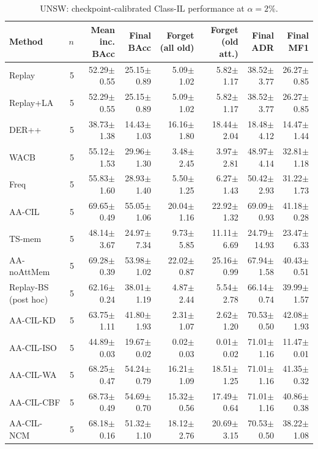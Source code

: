 \begin{table}[t]
\centering\scriptsize
\setlength{\tabcolsep}{3.3pt}
\caption{UNSW: checkpoint-calibrated Class-IL performance at $\alpha=2\%$.}\label{tab:forgetting-unsw_nb15}
\begin{tabular}{lrrrrrrr}
\toprule
Method & $n$ & Mean inc. BAcc & Final BAcc & Forget (all old) & Forget (old att.) & Final ADR & Final MF1 \\
\midrule
Replay & 5 & 52.29$\pm$0.55 & 25.15$\pm$0.89 & 5.09$\pm$1.02 & 5.82$\pm$1.17 & 38.52$\pm$3.77 & 26.27$\pm$0.85 \\
Replay+LA & 5 & 52.29$\pm$0.55 & 25.15$\pm$0.89 & 5.09$\pm$1.02 & 5.82$\pm$1.17 & 38.52$\pm$3.77 & 26.27$\pm$0.85 \\
DER++ & 5 & 38.73$\pm$1.38 & 14.43$\pm$1.03 & 16.16$\pm$1.80 & 18.44$\pm$2.04 & 18.48$\pm$4.12 & 14.47$\pm$1.44 \\
WACB & 5 & 55.12$\pm$1.53 & 29.96$\pm$1.30 & 3.48$\pm$2.45 & 3.97$\pm$2.81 & 48.97$\pm$4.14 & 32.81$\pm$1.18 \\
Freq & 5 & 55.83$\pm$1.60 & 28.93$\pm$1.40 & 5.50$\pm$1.25 & 6.27$\pm$1.43 & 50.42$\pm$2.93 & 31.22$\pm$1.73 \\
AA-CIL & 5 & 69.65$\pm$0.49 & 55.05$\pm$1.06 & 20.04$\pm$1.16 & 22.92$\pm$1.32 & 69.09$\pm$0.93 & 41.18$\pm$0.28 \\
TS-mem & 5 & 48.14$\pm$3.67 & 24.97$\pm$7.34 & 9.73$\pm$5.85 & 11.11$\pm$6.69 & 24.79$\pm$14.93 & 23.47$\pm$6.33 \\
AA-noAttMem & 5 & 69.28$\pm$0.39 & 53.98$\pm$1.02 & 22.02$\pm$0.87 & 25.16$\pm$0.99 & 67.94$\pm$1.58 & 40.43$\pm$0.51 \\
Replay-BS (post hoc) & 5 & 62.16$\pm$0.24 & 38.01$\pm$1.19 & 4.87$\pm$2.44 & 5.54$\pm$2.78 & 66.14$\pm$0.74 & 39.99$\pm$1.57 \\
AA-CIL-KD & 5 & 63.75$\pm$1.11 & 41.80$\pm$1.93 & 2.31$\pm$1.07 & 2.62$\pm$1.20 & 70.53$\pm$0.50 & 42.08$\pm$1.93 \\
AA-CIL-ISO & 5 & 44.89$\pm$0.03 & 19.67$\pm$0.02 & 0.02$\pm$0.03 & 0.01$\pm$0.02 & 71.01$\pm$1.16 & 11.47$\pm$0.01 \\
AA-CIL-WA & 5 & 68.25$\pm$0.47 & 54.24$\pm$0.79 & 16.21$\pm$1.09 & 18.51$\pm$1.25 & 71.01$\pm$1.16 & 41.35$\pm$0.32 \\
AA-CIL-CBF & 5 & 68.73$\pm$0.49 & 54.69$\pm$0.70 & 15.32$\pm$0.56 & 17.49$\pm$0.64 & 71.01$\pm$1.16 & 40.86$\pm$0.38 \\
AA-CIL-NCM & 5 & 68.18$\pm$0.16 & 51.32$\pm$1.10 & 18.12$\pm$2.76 & 20.69$\pm$3.15 & 70.53$\pm$0.50 & 38.22$\pm$1.08 \\

\end{tabular}
\end{table}
